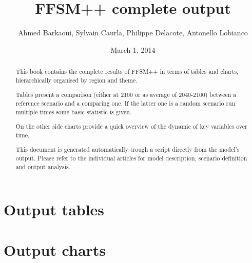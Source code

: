 \documentclass[a4paper,11pt]{paper}
\title{FFSM++ complete output}
\author{Ahmed Barkaoui, Sylvain Caurla, Philippe Delacote, Antonello Lobianco}
\date{
March 1, 2014
}
\begin{document}
\maketitle

\begin{abstract}
This book contains the complete results of FFSM++ in terms of tables and charts, hierarchically organised by region and theme.

Tables present a comparison (either at 2100 or as average of 2040-2100) between a reference scenario and a comparing one. If the latter one is a random scenario run multiple times some basic statistic is given.

On the other side charts provide a quick overview of the dynamic of key variables over time.

This document is generated automatically trough a script directly from the model's output. Please refer to the individual articles for model description, scenario definition and output analysis.

\end{abstract}

\thispagestyle{empty}
\newpage
\tableofcontents
\thispagestyle{empty}
\newpage
\part[Tables]{Output tables}

\clearpage
\newpage
\part[Charts]{Output charts}



%
\end{document}
